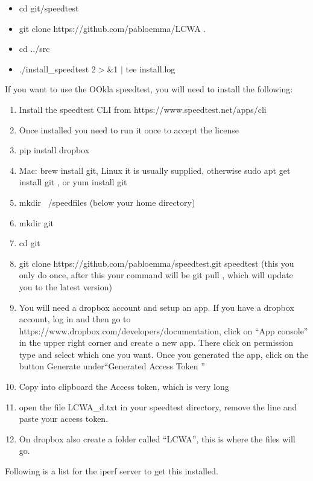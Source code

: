 \documentclass[12pt]{article}
\begin{document}
\begin{itemize}
\item cd git/speedtest
\item git clone https://github.com/pabloemma/LCWA .
\item cd ../src
\item ./install\_speedtest  2$>$\&1 $|$ tee install.log
\end{itemize}

\vspace{3cm}


If you want to use the OOkla speedtest, you will need to install the following:
\begin{enumerate}
\item	Install the speedtest CLI from  https://www.speedtest.net/apps/cli
\item Once installed you need to run it once to accept the license
\item pip install dropbox
\item Mac: brew install git, Linux it is usually supplied, otherwise sudo apt get install git , or yum install git
\item mkdir ~/speedfiles (below your home directory)
\item mkdir git
\item cd git
\item git clone https://github.com/pabloemma/speedtest.git speedtest (this you only do once, after this your command will be git pull , which will update you to the latest version)
\item You will need a dropbox account and setup an app. If you have a dropbox account, log in and then go to https://www.dropbox.com/developers/documentation, click on ``App console'' in the upper right corner and create a new app. There click on permission type and select which one you want. Once you generated the app, click on the button Generate under``Generated Access Token ''
\item Copy into clipboard the Access token, which is very long
\item open the file LCWA\_d.txt in your speedtest directory, remove the line and paste your access token.
\item On dropbox also create a folder called ``LCWA'', this is where the files will go.
\end{enumerate}

Following is a list for the iperf server to get this installed.
\end{document}
